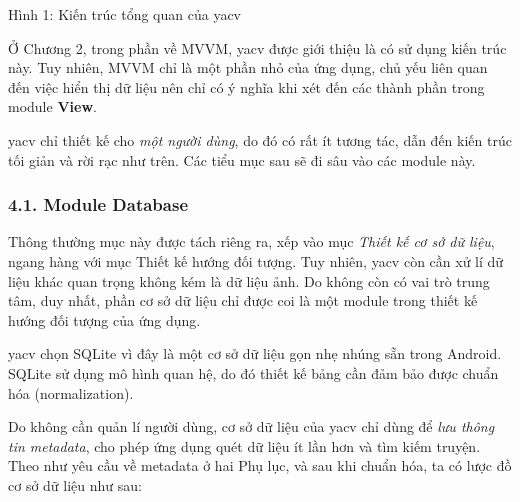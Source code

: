 \documentclass[
]{article}
\begin{document}
Hình 1: Kiến trúc tổng quan của yacv

Ở Chương 2, trong phần về MVVM, yacv được giới thiệu là có sử dụng kiến
trúc này. Tuy nhiên, MVVM chỉ là một phần nhỏ của ứng dụng, chủ yếu liên
quan đến việc hiển thị dữ liệu nên chỉ có ý nghĩa khi xét đến các thành
phần trong module \textbf{View}.

yacv chỉ thiết kế cho \emph{một người dùng}, do đó có rất ít tương tác,
dẫn đến kiến trúc tối giản và rời rạc như trên. Các tiểu mục sau sẽ đi
sâu vào các module này.

\hypertarget{module-database}{%
\subsubsection{\texorpdfstring{4.1. Module Database
}{4.1. Module Database }}\label{module-database}}

Thông thường mục này được tách riêng ra, xếp vào mục \emph{Thiết kế cơ
sở dữ liệu}, ngang hàng với mục Thiết kế hướng đối tượng. Tuy nhiên,
yacv còn cần xử lí dữ liệu khác quan trọng không kém là dữ liệu ảnh. Do
không còn có vai trò trung tâm, duy nhất, phần cơ sở dữ liệu chỉ được
coi là một module trong thiết kế hướng đối tượng của ứng dụng.

yacv chọn SQLite vì đây là một cơ sở dữ liệu gọn nhẹ nhúng sẵn trong
Android. SQLite sử dụng mô hình quan hệ, do đó thiết kế bảng cần đảm bảo
được chuẩn hóa (normalization).

Do không cần quản lí người dùng, cơ sở dữ liệu của yacv chỉ dùng để
\emph{lưu thông tin metadata}, cho phép ứng dụng quét dữ liệu ít lần hơn
và tìm kiếm truyện. Theo như yêu cầu về metadata ở hai Phụ lục, và sau
khi chuẩn hóa, ta có lược đồ cơ sở dữ liệu như sau:
\end{document}
